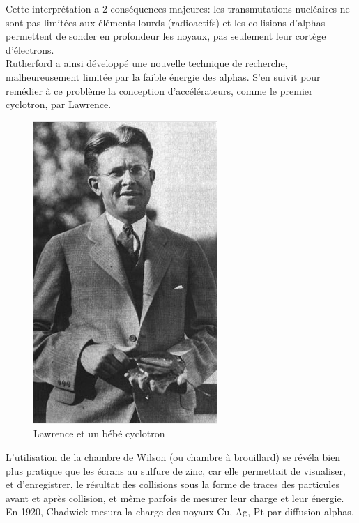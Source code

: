   Cette interprétation a 2 conséquences majeures: les transmutations nucléaires ne sont pas limitées aux éléments lourds (radioactifs) et les collisions d'alphas permettent de sonder en profondeur les noyaux, pas seulement leur cortège d'électrons. \\
  
  Rutherford a ainsi développé une nouvelle technique de recherche, malheureusement limitée par la faible énergie des alphas. S'en suivit pour remédier à ce problème la conception d'accélérateurs, comme le premier cyclotron, par Lawrence. 
  
     \begin{figure}[ht]
        \centering
        \includegraphics[scale=0.75]{Images1/cyclo.PNG}
        \caption{Lawrence et un bébé cyclotron}
    \end{figure}

    L’utilisation de la chambre de Wilson (ou chambre à brouillard) se révéla bien plus pratique que les écrans au sulfure de zinc, car elle permettait de visualiser, et d’enregistrer, le résultat des collisions sous la forme de traces des particules avant et après collision, et même parfois de mesurer leur charge et leur énergie. En 1920, Chadwick mesura la charge des noyaux Cu, Ag, Pt par diffusion alphas.
    
